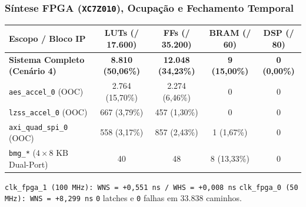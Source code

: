 \begin{frame}
  \frametitle{S\'intese FPGA (\texttt{XC7Z010}), Ocupa\c{c}\~ao e Fechamento Temporal}
  \scriptsize
  \renewcommand{\arraystretch}{1.15}
  \begin{tabular}{@{}lcccc@{}}
    \toprule
    \textbf{Escopo / Bloco IP} & \textbf{LUTs (/ 17.600)} & \textbf{FFs (/ 35.200)} & \textbf{BRAM (/ 60)} & \textbf{DSP (/ 80)}\\
    \midrule
    \textbf{Sistema Completo (Cen\'ario 4)} & \textbf{8.810 (50,06\%)} & \textbf{12.048 (34,23\%)} & \textbf{9 (15,00\%)} & \textbf{0 (0,00\%)}\\
    \texttt{aes\_accel\_0} (OOC) & 2.764 (15,70\%) & 2.274 (6,46\%) & 0 & 0\\
    \texttt{lzss\_accel\_0} (OOC) & 667 (3,79\%) & 457 (1,30\%) & 0 & 0\\
    \texttt{axi\_quad\_spi\_0} (OOC) & 558 (3,17\%) & 857 (2,43\%) & 1 (1,67\%) & 0\\
    \texttt{bmg\_*} ($4 \times 8\text{ KB}$ Dual-Port) & 40 & 48 & 8 (13,33\%) & 0\\
    \bottomrule
  \end{tabular}
  \par\vspace{1.2ex}
  \begin{pontoschave}
    \small \texttt{clk\_fpga\_1 (100 MHz): WNS = +0,551 ns / WHS = +0,008 ns} \textbar{} \texttt{clk\_fpga\_0 (50 MHz): WNS = +8,299 ns} \textbar{} \texttt{0} latches e \texttt{0} falhas em 33.838 caminhos.
  \end{pontoschave}
\end{frame}
